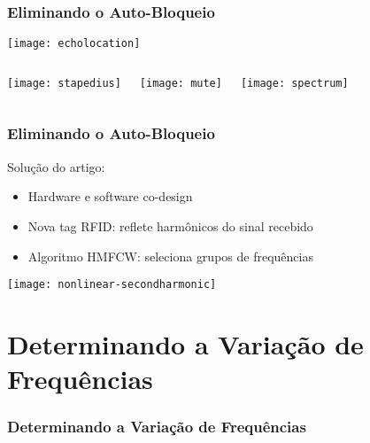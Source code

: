 \begin{frame}
    \frametitle{Eliminando o Auto-Bloqueio}

    \begin{center}
        \texttt{[image: echolocation]}
    \end{center}

    \pause
    \begin{columns}[T,onlytextwidth]
        \begin{center}
            \texttt{[image: stapedius]}
        \end{center}

        \pause

        \begin{center}
            \vfill
            \texttt{[image: mute]}
        \end{center}

        \pause

        \begin{center}
            \texttt{[image: spectrum]}
        \end{center}
    \end{columns}
\end{frame}

\begin{frame}
    \frametitle{Eliminando o Auto-Bloqueio}

    Solução do artigo:
    \begin{itemize}
        \item Hardware e software \alert{co-design}
        \item Nova tag RFID: \alert{reflete harmônicos} do sinal recebido
        \item Algoritmo HMFCW: seleciona \alert{grupos de frequências}
    \end{itemize}

    \pause

    \begin{center}
        \texttt{[image: nonlinear-secondharmonic]}
    \end{center}
\end{frame}

\section{Determinando a Variação de Frequências}
\begin{frame}
    \frametitle{Determinando a Variação de Frequências}

\end{frame}

